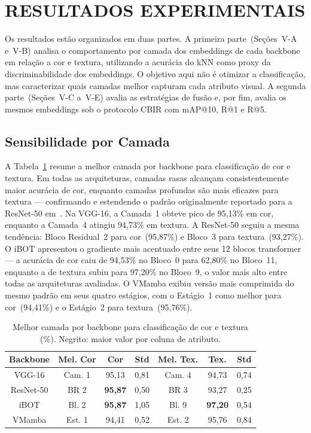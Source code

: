 \documentclass[letterpaper, 10 pt, conference]{ieeeconf}
\begin{document}
\section{RESULTADOS EXPERIMENTAIS}

Os resultados estão organizados em duas partes.
A primeira parte~(Seções~V-A e~V-B) analisa o comportamento por camada
dos embeddings de cada backbone em relação a cor e textura, utilizando a
acurácia do kNN como proxy da discriminabilidade dos embeddings.
O objetivo aqui não é otimizar a classificação, mas caracterizar quais
camadas melhor capturam cada atributo visual.
A segunda parte~(Seções~V-C a~V-E) avalia as estratégias de fusão e,
por fim, avalia os mesmos embeddings sob o protocolo CBIR com
mAP@10, R@1 e R@5.

\subsection{Sensibilidade por Camada}

A Tabela~\ref{tab_best_layer} resume a melhor camada por backbone para
classificação de cor e textura.
Em todas as arquiteturas, camadas rasas alcançam consistentemente maior
acurácia de cor, enquanto camadas profundas são mais eficazes para
textura — confirmando e estendendo o padrão originalmente reportado para
a ResNet-50 em~\cite{b2}.
Na VGG-16, a Camada~1 obteve pico de 95,13\% em cor, enquanto a
Camada~4 atingiu 94,73\% em textura.
A ResNet-50 seguiu a mesma tendência: Bloco Residual~2 para
cor~(95,87\%) e Bloco~3 para textura~(93,27\%).
O iBOT apresentou o gradiente mais acentuado entre seus 12 blocos
transformer — a acurácia de cor caiu de 94,53\% no Bloco~0 para 62,80\%
no Bloco~11, enquanto a de textura subiu para 97,20\% no Bloco~9, o
valor mais alto entre todas as arquiteturas avaliadas.
O VMamba exibiu versão mais comprimida do mesmo padrão em seus quatro
estágios, com o Estágio~1 como melhor para cor~(94,41\%) e o Estágio~2
para textura~(95,76\%).

\begin{table}[htbp]
\caption{Melhor camada por backbone para classificação de cor e textura
         (\%). Negrito: maior valor por coluna de atributo.}
\begin{center}
\begin{tabular}{c|c|c|c|c|c|c}
\hline
\textbf{Backbone} & \textbf{Mel. Cor} & \textbf{Cor} & \textbf{Std}
                  & \textbf{Mel. Tex.} & \textbf{Tex.} & \textbf{Std} \\
\hline
VGG-16    & Cam. 1 & 95,13          & 0,81 & Cam. 4  & 94,73          & 0,74 \\
ResNet-50 & BR 2   & \textbf{95,87} & 0,50 & BR 3    & 93,27          & 0,25 \\
iBOT      & Bl. 2  & \textbf{95,87} & 1,05 & Bl. 9   & \textbf{97,20} & 0,54 \\
VMamba    & Est. 1 & 94,41          & 0,52 & Est. 2  & 95,76          & 0,84 \\
\hline
\end{tabular}
\label{tab_best_layer}
\end{center}
\end{table}
\end{document}
